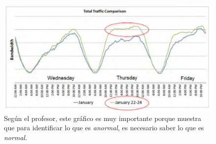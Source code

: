 \begin{figure}[htbp]
   \centering
   \includegraphics{images/03/ddos.png}
   \caption{Según el profesor, este gráfico es muy importante porque muestra que para identificar lo que es \emph{anormal}, es necesario saber lo que es \emph{normal}.}
   \label{fig:03/ddos}
\end{figure}